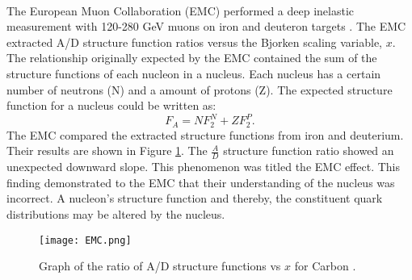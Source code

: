 \paragraph{}The European Muon Collaboration (EMC) performed a deep inelastic measurement with 120-280 GeV muons on iron and deuteron targets \cite{challenge}. The EMC extracted A/D structure function ratios versus the Bjorken scaling variable, $x$.  The relationship originally expected by the EMC contained the sum of the structure functions of each nucleon in a nucleus. Each nucleus has a certain number of neutrons (N) and a amount of protons (Z). The expected structure function for a nucleus could be written as:
\begin{equation}
F_A = N F_2^N + ZF_2^P.
\end{equation}
 The EMC compared the extracted structure functions from iron and deuterium. Their results are shown in Figure \ref{EMCOld}. The $\frac{A}{D}$ structure function ratio showed an unexpected downward slope. This phenomenon was titled the EMC effect. This finding demonstrated to the EMC that their understanding of the nucleus was incorrect. A nucleon's structure function and thereby, the constituent quark distributions may be altered by the nucleus. 
\begin{figure}[h]
\centering
 \caption{ Graph of the ratio of A/D structure functions vs $x$ for Carbon \cite{CC}.}
 \label{EMCOld}
 \texttt{[image: EMC.png]} 
 \end{figure} 

